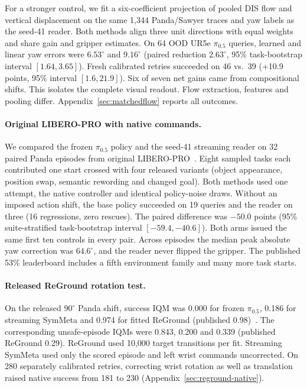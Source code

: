 \documentclass{article}
\theoremstyle{plain}
\theoremstyle{remark}
\begin{document}
For a stronger control, we fit a six-coefficient projection of pooled DIS flow and vertical displacement on the same 1,344 Panda/Sawyer traces and yaw labels as the seed-41 reader. Both methods align three unit directions with equal weights and share gain and gripper estimates. On 64 OOD UR5e $\pi_{0.5}$ queries, learned and linear yaw errors were $6.53^\circ$ and $9.16^\circ$ (paired reduction $2.63^\circ$, 95\% task-bootstrap interval $[1.64,3.65]$). Fresh calibrated retries succeeded on 46 vs.\ 39 (+10.9 points, 95\% interval $[1.6,21.9]$). Six of seven net gains came from compositional shifts. This isolates the complete visual readout. Flow extraction, features and pooling differ. Appendix~\ref{sec:matchedflow} reports all outcomes.

\paragraph{Original LIBERO-PRO with native commands.} We compared the frozen $\pi_{0.5}$ policy and the seed-41 streaming reader on 32 paired Panda episodes from original LIBERO-PRO~\citep{zhou2025liberopro}. Eight sampled tasks each contributed one start crossed with four released variants (object appearance, position swap, semantic rewording and changed goal). Both methods used one attempt, the native controller and identical policy-noise draws. Without an imposed action shift, the base policy succeeded on 19 queries and the reader on three (16 regressions, zero rescues). The paired difference was $-50.0$ points (95\% suite-stratified task-bootstrap interval $[-59.4,-40.6]$). Both arms issued the same first ten controls in every pair. Across episodes the median peak absolute yaw correction was $64.6^\circ$, and the reader never flipped the gripper. The published 53\% leaderboard includes a fifth environment family and many more task starts.

\paragraph{Released ReGround rotation test.} On the released $90^\circ$ Panda shift, success IQM was 0.000 for frozen $\pi_{0.5}$, 0.186 for streaming SymMeta and 0.974 for fitted ReGround (published 0.98)~\citep{siddique2026reground}. The corresponding unsafe-episode IQMs were 0.843, 0.200 and 0.339 (published ReGround 0.29). ReGround used 10,000 target transitions per fit. Streaming SymMeta used only the scored episode and left wrist commands uncorrected. On 280 separately calibrated retries, correcting wrist rotation as well as translation raised native success from 181 to 230 (Appendix~\ref{sec:reground-native}).
\end{document}
